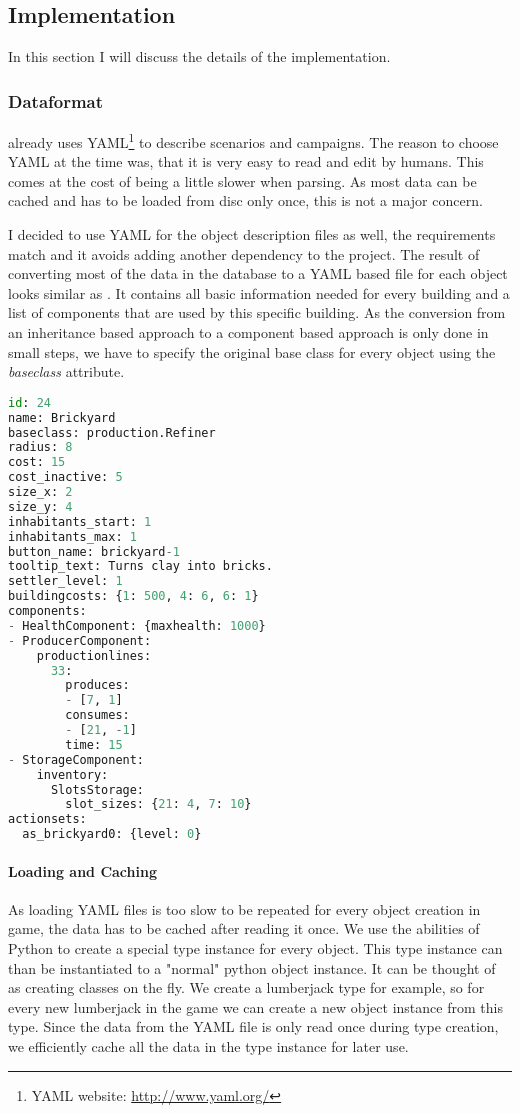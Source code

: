 \subsection{Implementation}
In this section I will discuss the details of the implementation.

\subsubsection{Dataformat}
\UH{} already uses YAML\footnote{YAML website: \url{http://www.yaml.org/}} to describe scenarios and campaigns. The
reason to choose YAML at the time was, that it is very easy to read and edit by humans. This comes at the cost of being
a little slower when parsing. As most data can be cached and has to be loaded from disc only once, this is not a major
concern.

I decided to use YAML for the object description files as well, the requirements match and it avoids adding another
dependency to the project. The result of converting most of the data in the database to a YAML based file for each
object looks similar as . It contains all basic information needed for every building and a list of components
that are used by this specific building. As the conversion from an inheritance based approach to a component based
approach is only done in small steps, we have to specify the original base class for every object using the
\textit{baseclass} attribute.


\begin{lstlisting}[language=python,caption=A basic (shortened) building definition in YAML for \UH{}, label=uhyaml]
id: 24
name: Brickyard
baseclass: production.Refiner
radius: 8
cost: 15
cost_inactive: 5
size_x: 2
size_y: 4
inhabitants_start: 1
inhabitants_max: 1
button_name: brickyard-1
tooltip_text: Turns clay into bricks.
settler_level: 1
buildingcosts: {1: 500, 4: 6, 6: 1}
components:
- HealthComponent: {maxhealth: 1000}
- ProducerComponent:
    productionlines:
      33:
        produces:
        - [7, 1]
        consumes:
        - [21, -1]
        time: 15
- StorageComponent:
    inventory:
      SlotsStorage:
        slot_sizes: {21: 4, 7: 10}
actionsets:
  as_brickyard0: {level: 0}
\end{lstlisting}

\paragraph{Loading and Caching}
As loading YAML files is too slow to be repeated for every object creation in game, the data has to be cached after
reading it once. We use the abilities of Python to create a special type instance for every object. This type instance can
than be instantiated to a "normal" python object instance. It can be thought of as creating classes on the fly. We
create a lumberjack type for example, so for every new lumberjack in the game we can create a new object instance from
this type.
Since the data from the YAML file is only read once during type creation, we efficiently cache all the data in the
type instance for later use.

